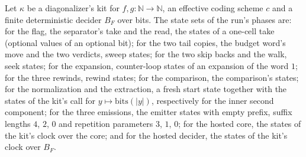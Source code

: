 \begin{definition}
\label{Turing.NTimeDiag.DzQPh}
\leanok
{}
Let $\kappa$ be a diagonalizer's kit for $f, g : \mathbb{N} \to \mathbb{N}$, an effective coding scheme $c$ and a finite deterministic decider $B_F$ over bits. The state sets of the run's phases are: for the flag, the separator's take and the read, the states of a one-cell take (optional values of an optional bit); for the two tail copies, the budget word's move and the two verdicts, sweep states; for the two skip backs and the walk, seek states; for the expansion, counter-loop states of an expansion of the word $1$; for the three rewinds, rewind states; for the comparison, the comparison's states; for the normalization and the extraction, a fresh start state together with the states of the kit's call for $y \mapsto \mathrm{bits}(|y|)$, respectively for the inner second component; for the three emissions, the emitter states with empty prefix, suffix lengths $4$, $2$, $0$ and repetition parameters $3$, $1$, $0$; for the hosted core, the states of the kit's clock over the core; and for the hosted decider, the states of the kit's clock over $B_F$.
\end{definition}

